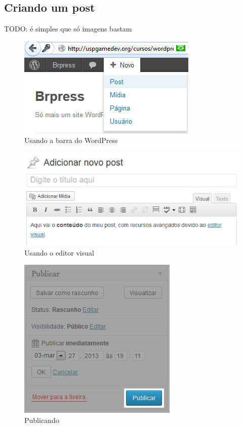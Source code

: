 \documentclass[12pt,onecolumn]{article}
\begin{document}
	\subsection{Criando um post}
		TODO: é simples que só imagens bastam
		\begin{figure}[H]
			\centering
			\includegraphics{post1.png}
			\caption{Usando a barra do WordPress}
		\end{figure}
		\begin{figure}[H]
			\centering
			\includegraphics{post2.png}
			\caption{Usando o editor visual}
		\end{figure}
		\begin{figure}[H]
			\centering
			\includegraphics{post3.png}
			\caption{Publicando}
		\end{figure}
		
\end{document}
